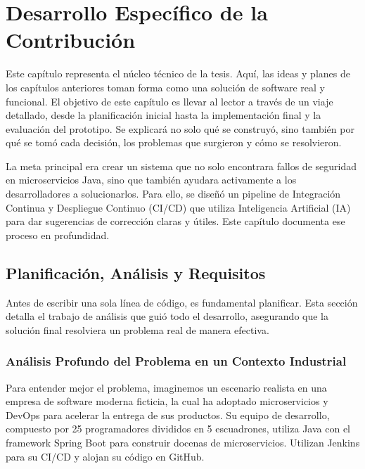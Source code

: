 



\chapter{Desarrollo Específico de la Contribución}
\label{chap:desarrollo}

Este capítulo representa el núcleo técnico de la tesis. Aquí, las ideas y planes de los capítulos anteriores toman forma como una solución de software real y funcional. El objetivo de este capítulo es llevar al lector a través de un viaje detallado, desde la planificación inicial hasta la implementación final y la evaluación del prototipo. Se explicará no solo qué se construyó, sino también por qué se tomó cada decisión, los problemas que surgieron y cómo se resolvieron.

La meta principal era crear un sistema que no solo encontrara fallos de seguridad en microservicios Java, sino que también ayudara activamente a los desarrolladores a solucionarlos. Para ello, se diseñó un pipeline de Integración Continua y Despliegue Continuo (CI/CD) que utiliza Inteligencia Artificial (IA) para dar sugerencias de corrección claras y útiles. Este capítulo documenta ese proceso en profundidad.

\section{Planificación, Análisis y Requisitos}
\label{sec:plani_desarrollo}

Antes de escribir una sola línea de código, es fundamental planificar. Esta sección detalla el trabajo de análisis que guió todo el desarrollo, asegurando que la solución final resolviera un problema real de manera efectiva.

\subsection{Análisis Profundo del Problema en un Contexto Industrial}

Para entender mejor el problema, imaginemos un escenario realista en una empresa de software moderna ficticia, la cual ha adoptado microservicios y DevOps para acelerar la entrega de sus productos. Su equipo de desarrollo, compuesto por 25 programadores divididos en 5 escuadrones, utiliza Java con el framework Spring Boot para construir docenas de microservicios. Utilizan Jenkins para su CI/CD y alojan su código en GitHub.

